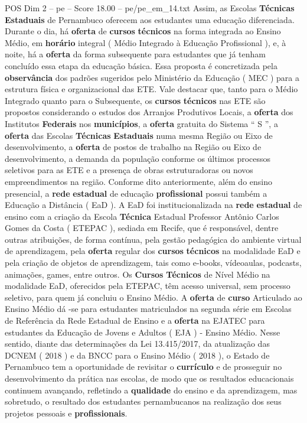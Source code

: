 \begin{textsample}{POS Dim 2 – pe – Score 18.00 – pe/pe\_em\_14.txt}
Assim, as Escolas \textbf{Técnicas} \textbf{Estaduais} de Pernambuco oferecem aos estudantes uma educação diferenciada.
Durante o dia, há \textbf{oferta} de \textbf{cursos} \textbf{técnicos} na forma integrada ao Ensino Médio, em \textbf{horário} integral ( Médio Integrado à Educação Profissional ), e, à noite, há a \textbf{oferta} da forma subsequente para estudantes que já tenham concluído essa etapa da educação básica.
Essa proposta é concretizada pela \textbf{observância} dos padrões sugeridos pelo Ministério da Educação ( MEC ) para a estrutura física e organizacional das ETE.
Vale destacar que, tanto para o Médio Integrado quanto para o Subsequente, os \textbf{cursos} \textbf{técnicos} nas ETE são propostos considerando o estudos dos Arranjos Produtivos Locais, a \textbf{oferta} dos Institutos \textbf{Federais} nos \textbf{municípios}, a \textbf{oferta} gratuita do Sistema “ S ”, a \textbf{oferta} das Escolas \textbf{Técnicas} \textbf{Estaduais} numa mesma Região ou Eixo de desenvolvimento, a \textbf{oferta} de postos de trabalho na Região ou Eixo de desenvolvimento, a demanda da população conforme os últimos processos seletivos para as ETE e a presença de obras estruturadoras ou novos empreendimentos na região.
Conforme dito anteriormente, além do ensino presencial, a \textbf{rede} \textbf{estadual} de educação \textbf{profissional} possui também a Educação a Distância ( EaD ).
A EaD foi institucionalizada na \textbf{rede} \textbf{estadual} de ensino com a criação da Escola \textbf{Técnica} Estadual Professor Antônio Carlos Gomes da Costa ( ETEPAC ), sediada em Recife, que é responsável, dentre outras atribuições, de forma contínua, pela gestão pedagógica do ambiente virtual de aprendizagem, pela \textbf{oferta} regular dos \textbf{cursos} \textbf{técnicos} na modalidade EaD e pela criação de objetos de aprendizagem, tais como e-books, vídeoaulas, podcasts, animações, games, entre outros.
Os \textbf{Cursos} \textbf{Técnicos} de Nível Médio na modalidade EaD, oferecidos pela ETEPAC, têm acesso universal, sem processo seletivo, para quem já concluiu o Ensino Médio.
A \textbf{oferta} de \textbf{curso} Articulado ao Ensino Médio dá -se para estudantes matriculados na segunda série em Escolas de Referência da Rede Estadual de Ensino e a \textbf{oferta} na EJATEC para estudantes da Educação de Jovens e Adultos ( EJA ) - Ensino Médio.
Nesse sentido, diante das determinações da Lei 13.415/2017, da atualização das DCNEM ( 2018 ) e da BNCC para o Ensino Médio ( 2018 ), o Estado de Pernambuco tem a oportunidade de revisitar o \textbf{currículo} e de prosseguir no desenvolvimento da prática nas escolas, de modo que os resultados educacionais continuem avançando, refletindo a \textbf{qualidade} do ensino e da aprendizagem, mas sobretudo, o resultado dos estudantes pernambucanos na realização dos seus projetos pessoais e \textbf{profissionais}.

\end{textsample}
